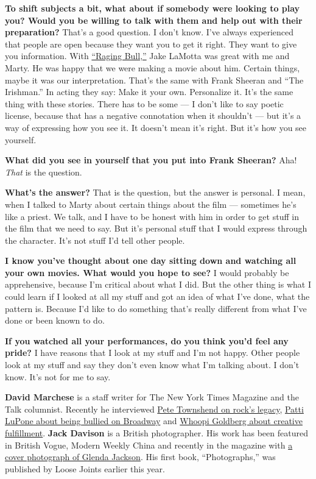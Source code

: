 \textbf{To shift subjects a bit, what about if somebody were looking to
play you? Would you be willing to talk with them and help out with their
preparation?} That's a good question. I don't know. I've always
experienced that people are open because they want you to get it right.
They want to give you information. With
\href{https://www.nytimes3xbfgragh.onion/1980/11/14/archives/robert-de-niro-in-raging-bull.html}{``Raging
Bull,''} Jake LaMotta was great with me and Marty. He was happy that we
were making a movie about him. Certain things, maybe it was our
interpretation. That's the same with Frank Sheeran and ``The Irishman.''
In acting they say: Make it your own. Personalize it. It's the same
thing with these stories. There has to be some --- I don't like to say
poetic license, because that has a negative connotation when it
shouldn't --- but it's a way of expressing how you see it. It doesn't
mean it's right. But it's how you see yourself.

\textbf{What did you see in yourself that you put into Frank Sheeran?}
Aha! \emph{That} is the question.

\textbf{What's the answer?} That is the question, but the answer is
personal. I mean, when I talked to Marty about certain things about the
film --- sometimes he's like a priest. We talk, and I have to be honest
with him in order to get stuff in the film that we need to say. But it's
personal stuff that I would express through the character. It's not
stuff I'd tell other people.

\textbf{I know you've thought about one day sitting down and watching
all your own movies. What would you hope to see?} I would probably be
apprehensive, because I'm critical about what I did. But the other thing
is what I could learn if I looked at all my stuff and got an idea of
what I've done, what the pattern is. Because I'd like to do something
that's really different from what I've done or been known to do.

\textbf{If you watched all your performances, do you think you'd feel
any pride?} I have reasons that I look at my stuff and I'm not happy.
Other people look at my stuff and say they don't even know what I'm
talking about. I don't know. It's not for me to say.

\textbf{David Marchese} is a staff writer for The New York Times
Magazine and the Talk columnist. Recently he interviewed
\href{https://www.nytimes3xbfgragh.onion/interactive/2019/11/25/magazine/pete-townshend-the-who-interview.html}{Pete
Townshend on rock's legacy},
\href{https://www.nytimes3xbfgragh.onion/interactive/2019/10/21/magazine/patti-lupone-broadway-company.html}{Patti
LuPone about being bullied on Broadway} and
\href{https://www.nytimes3xbfgragh.onion/interactive/2019/07/08/magazine/whoopi-goldberg-controversy.html}{Whoopi
Goldberg about creative fulfillment}. \textbf{Jack Davison} is a British
photographer. His work has been featured in British Vogue, Modern Weekly
China and recently in the magazine with
\href{https://www.nytimes3xbfgragh.onion/2019/03/27/magazine/glenda-jackson-king-lear.html}{a
cover photograph of Glenda Jackson}. His first book, ``Photographs,''
was published by Loose Joints earlier this year.

